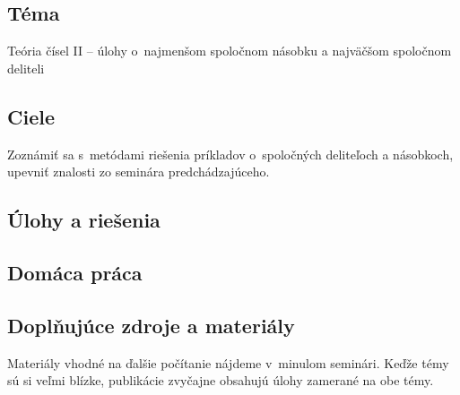 
\subsection*{Téma}
Teória čísel II -- úlohy o~najmenšom spoločnom násobku a najväčšom spoločnom deliteli

\subsection*{Ciele}
Zoznámiť sa s~metódami riešenia príkladov o~spoločných deliteľoch a násobkoch, upevniť znalosti zo seminára predchádzajúceho.

\subsection*{Úlohy a riešenia}























\subsection*{Domáca práca}






\subsection*{Doplňujúce zdroje a materiály}
Materiály vhodné na ďalšie počítanie nájdeme v~minulom seminári. Keďže témy sú si veľmi blízke, publikácie zvyčajne obsahujú úlohy zamerané na obe témy.

